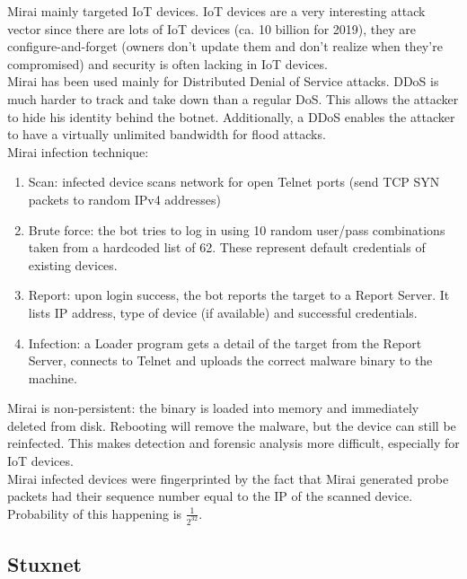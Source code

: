 \documentclass[11pt,oneside,a4paper]{article}
\begin{document}
Mirai mainly targeted IoT devices. IoT devices are a very interesting attack vector since there are lots of IoT devices (ca. 10 billion for 2019), they are configure-and-forget (owners don't update them and don't realize when they're compromised) and security is often lacking in IoT devices.\\
Mirai has been used mainly for Distributed Denial of Service attacks. DDoS is much harder to track and take down than a regular DoS. This allows the attacker to hide his identity behind the botnet. Additionally, a DDoS enables the attacker to have a virtually unlimited bandwidth for flood attacks.\\
Mirai infection technique:

\vspace{-\topsep}
\begin{enumerate}
	\setlength{\itemsep}{0pt}
	\setlength{\parskip}{0pt}
	\item Scan: infected device scans network for open Telnet ports (send TCP SYN packets to random IPv4 addresses)
	\item Brute force: the bot tries to log in using 10 random user/pass combinations taken from
	a hardcoded list of 62. These represent default credentials of existing devices.
	\item Report: upon login success, the bot reports the target to a Report Server. It lists IP
	address, type of device (if available) and successful credentials.
	\item Infection: a Loader program gets a detail of the target from the Report Server, connects
	to Telnet and uploads the correct malware binary to the machine.
\end{enumerate}
\vspace{-\topsep}

\noindent Mirai is non-persistent: the binary is loaded into memory and immediately deleted from disk. Rebooting will remove the malware, but the device can still be reinfected. This makes detection and forensic analysis more difficult, especially for IoT devices.\\
Mirai infected devices were fingerprinted by the fact that Mirai generated probe packets had their sequence number equal to the IP of the scanned device. Probability of this happening is $\frac{1}{2^{32}}$.

\subsection{Stuxnet}
\end{document}
